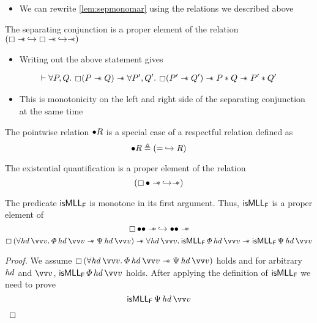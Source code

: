 \documentclass[thesis.tex]{subfiles}
\begin{document}
\begin{itemize}
    \item We can rewrite \cref*{lem:sepmonomar} using the relations we described above
\end{itemize}
\begin{lemma}
    The separating conjunction is a proper element of the relation $(\always\wand \respect \always\wand \respect \wand)$
\end{lemma}
\begin{itemize}
    \item Writing out the above statement gives
\end{itemize}
\begin{align*}
    \proves \All \prop,\propB. \always(\prop \wand \propB) \wand \All \prop',\propB'. \always(\prop' \wand \propB') \wand \prop * \propB \wand \prop' * \propB'
\end{align*}
\begin{itemize}
    \item This is monotonicity on the left and right side of the separating conjunction at the same time
\end{itemize}

\begin{definition}
    The pointwise relation $\bullet R$ is a special case of a respectful relation defined as
    \[\point \rel \eqdef (= \respect \rel)\]
\end{definition}

\begin{lemma}
    The existential quantification is a proper element of the relation \[(\mathop{\boxempty}\bullet\mathrel{-\!\!\ast} \nobreak\hskip 0.2em plus 0.1em\hookrightarrow \mathrel{-\!\!\ast})\]
\end{lemma}

\begin{example}
    The predicate $\textsf{\upshape isMLL}_{\textsf{\upshape F}}$ is monotone in its first argument. Thus, $\textsf{\upshape isMLL}_{\textsf{\upshape F}}$ is a proper element of
    \[
        \mathop{\boxempty} \bullet \bullet \mathrel{-\!\!\ast} \nobreak\hskip 0.2em plus 0.1em\hookrightarrow \bullet \bullet \mathrel{-\!\!\ast}
    \]
    \[
        \always{(\All \langv{hd}\, \vect{v}. \pred\, \langv{hd}\, \vect{v} \wand \predB\, \langv{hd}\, \vect{v})} \wand \All \langv{hd}\, \vect{v}. \isMLL_\hopred\, \pred\, \langv{hd}\, \vect{v} \wand \isMLL_\hopred\, \predB\, \langv{hd}\, \vect{v}
    \]
\end{example}
\begin{proof}
    We assume $\always{(\All \langv{hd}\, \vect{v}. \pred\, \langv{hd}\, \vect{v} \wand \predB\, \langv{hd}\, \vect{v})}$ holds and for arbitrary $\mathit{hd}$ and $\vect{v}$, $\isMLL_\hopred\, \pred\, \langv{hd}\, \vect{v}$ holds.
    After applying the definition of $\textsf{\upshape isMLL}_{\textsf{\upshape F}}$ we need to prove \[\isMLL_\hopred\, \predB\, \langv{hd}\, \vect{v}\]
\end{proof}
\end{document}

